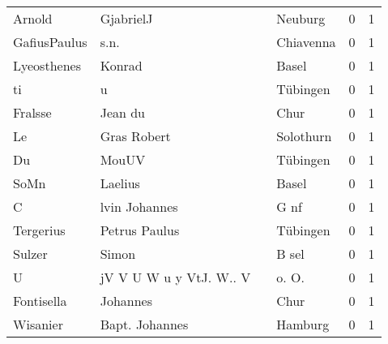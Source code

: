 \begin{tabular}{llllrr}
                   Arnold &                          GjabrielJ &             &                                     Neuburg &          0 &         1 \\
             GafiusPaulus &                               s.n. &             &                                   Chiavenna &          0 &         1 \\
              Lyeosthenes &                             Konrad &             &                                       Basel &          0 &         1 \\
                       ti &                                  u &             &                                    Tübingen &          0 &         1 \\
                  Fralsse &                            Jean du &             &                                        Chur &          0 &         1 \\
                       Le &                        Gras Robert &             &                                   Solothurn &          0 &         1 \\
                       Du &                              MouUV &             &                                    Tübingen &          0 &         1 \\
                     SoMn &                            Laelius &             &                                       Basel &          0 &         1 \\
                        C &                      lvin Johannes &             &                                        G nf &          0 &         1 \\
                Tergerius &                      Petrus Paulus &             &                                    Tübingen &          0 &         1 \\
                   Sulzer &                              Simon &             &                                       B sel &          0 &         1 \\
                        U &            jV V U W u y VtJ. W.. V &             &                                      o. O.  &          0 &         1 \\
               Fontisella &                           Johannes &             &                                        Chur &          0 &         1 \\
                 Wisanier &                     Bapt. Johannes &             &                                     Hamburg &          0 &         1 \\

\end{tabular}
